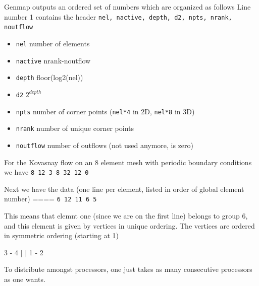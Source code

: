 Genmap outputs an ordered set of numbers which are organized as follows
Line number 1 contains the header {\tt nel, nactive, depth, d2, npts, nrank, noutflow}

\begin{itemize}
\item {\tt nel}  number of elements
\item {\tt nactive} nrank-noutflow
\item {\tt depth} floor(log2(nel))
\item {\tt d2} $2^{depth}$
\item {\tt npts} number of corner points ({\tt nel*4} in 2D, {\tt nel*8} in 3D)
\item {\tt nrank} number of unique corner points
\item {\tt noutflow} number of outflows (not used anymore, is zero)
\end{itemize}

For the Kovasnay flow on an 8 element mesh with periodic boundary conditions we have
 {\tt 8         12          3          8         32         12          0}
 

Next we have the data (one line per element, listed in order of global element number)
====
{\tt 6          12          11           6           5}

This means that elemnt one (since we are on the first line) belongs to group 6, and this element is given by vertices in unique ordering. 
The vertices are ordered in symmetric ordering (starting at 1)

3 - 4
|   |
1 - 2

To distribute amongst processors, one just takes as many consecutive
processors as one wants.
